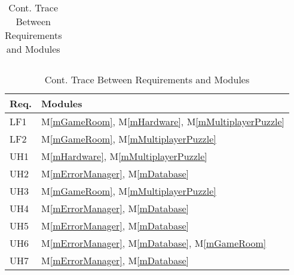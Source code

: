 \documentclass[12pt, titlepage]{article}
\newcommand{\mref}[1]{M\ref{#1}}
\begin{document}
\begin{table}[H]
\begin{tabular}{p{} p{}}
\bottomrule
\end{tabular}
\caption{Cont. Trace Between Requirements and Modules}
\label{TblRT2}
\end{table}

\begin{table}[H]
\centering
\begin{tabular}{p{} p{}}
\toprule
\textbf{Req.} & \textbf{Modules}\\
\midrule
LF1 & \mref{mGameRoom}, \mref{mHardware}, \mref{mMultiplayerPuzzle}\\
LF2 & \mref{mGameRoom}, \mref{mMultiplayerPuzzle}\\
UH1 & \mref{mHardware}, \mref{mMultiplayerPuzzle}\\
UH2 & \mref{mErrorManager}, \mref{mDatabase}\\
UH3 & \mref{mGameRoom}, \mref{mMultiplayerPuzzle}\\
UH4 & \mref{mErrorManager}, \mref{mDatabase}\\
UH5 & \mref{mErrorManager}, \mref{mDatabase}\\
UH6 & \mref{mErrorManager}, \mref{mDatabase}, \mref{mGameRoom}\\
UH7 & \mref{mErrorManager}, \mref{mDatabase}\\


\bottomrule
\end{tabular}
\caption{Cont. Trace Between Requirements and Modules}
\label{TblRT2}
\end{table}
\end{document}
